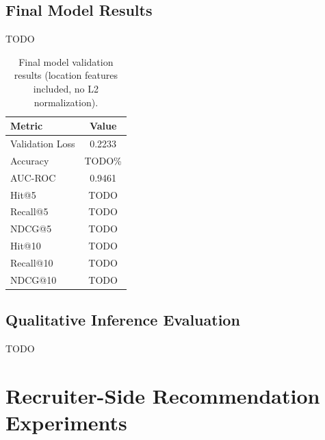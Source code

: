 \subsection{Final Model Results}
\label{sec:exp_user_results}

TODO

\begin{table}[htbp]
    \centering
    \caption{Final model validation results (location features included, no L2 normalization).}
    \label{tab:user_final_results}
    \begin{tabular}{|l|c|}
        \hline
        \textbf{Metric} & \textbf{Value} \\
        \hline
        Validation Loss & 0.2233 \\
        Accuracy        & TODO\% \\
        AUC-ROC         & 0.9461 \\
        Hit@5           & TODO \\
        Recall@5        & TODO \\
        NDCG@5          & TODO \\
        Hit@10          & TODO \\
        Recall@10       & TODO \\
        NDCG@10         & TODO \\
        \hline
    \end{tabular}
\end{table}

\subsection{Qualitative Inference Evaluation}
\label{sec:exp_user_inference}

TODO

\section{Recruiter-Side Recommendation Experiments}
\label{sec:exp_recruiter}

